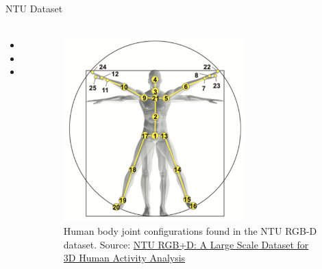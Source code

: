 \documentclass[aspectratio=169]{beamer}
\begin{document}
\begin{frame}{NTU Dataset}
      \framesubtitle{}%
      
      \vspace{-0.75cm}
      \begin{columns}
      \begin{itemize}
            \item
            \item 
            \item 
      \end{itemize}
      
      \begin{figure}[ht!]
            \centering
            \includegraphics[width=0.7\textwidth]{images/joint_config.pdf}
            \caption{Human body joint configurations found in the NTU RGB-D dataset. Source: \href{https://doi.org/10.48550/arXiv.1604.02808}{NTU RGB+D: A Large Scale Dataset for 3D Human Activity Analysis}}
      \end{figure}      
      \end{columns}
\end{frame}
\end{document}
